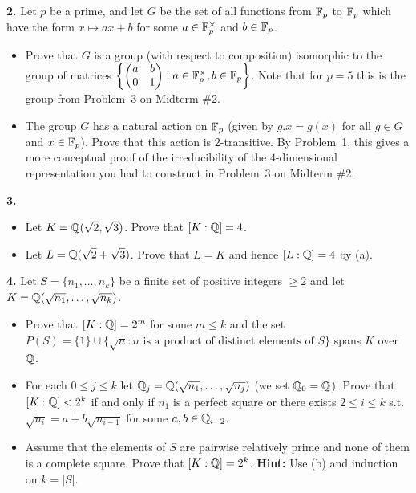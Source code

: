 \documentclass[11pt]{amsart}
\begin{document}
{\bf 2.} Let $p$ be a prime, and let 
$G$ be the set of all functions from ${\mathbb F}_p$ to ${\mathbb F}_p$ which have the form
$x\mapsto ax+b$ for some $a\in{\mathbb F}_p^{\times}$ and $b\in{\mathbb F}_p$.
\begin{itemize}
\item[(a)] Prove that $G$ is a group (with respect to composition) isomorphic to the group of matrices $\left\{\begin{pmatrix} a&b\\ 0&1\end{pmatrix}:
a\in{\mathbb F}_p^{\times}, b\in{\mathbb F}_p\right\}$. Note that for $p=5$ this is the group
from Problem~3 on Midterm \#2.
\item[(b)] The group $G$ has a natural action on ${\mathbb F}_p$ (given by
$g.x=g(x)$ for all $g\in G$ and $x\in{\mathbb F}_p$). Prove that this action is
$2$-transitive. By Problem~1, this gives a more conceptual proof of the irreducibility of the $4$-dimensional representation
you had to construct in Problem~3 on Midterm \#2. 
\end{itemize}
\skv
\skv
{\bf 3.} \rm 

\begin{itemize}

\item[(a)] Let $K={\mathbb Q}(\sqrt{2},\sqrt{3})$. Prove that $[K:{\mathbb Q}]=4$.

\item[(b)] Let $L={\mathbb Q}(\sqrt{2}+\sqrt{3})$. Prove that $L=K$ and hence $[L:{\mathbb Q}]=4$ by (a).
\end{itemize}

{\bf 4.} \rm Let $S=\{n_1,\ldots, n_k\}$ be a finite set of positive integers $\geq 2$
and let $K={\mathbb Q}(\sqrt{n_1},\ldots, \sqrt{n_k})$.
\begin{itemize}
\item[(a)] Prove that $[K:{\mathbb Q}]=2^m$ for some $m\leq k$ and the set $P(S)=\{1\}\cup \{\sqrt{n} : n \mbox{ is a product of distinct elements of }S\}$ spans $K$ over ${\mathbb Q}$.

\item[(b)] For each $0\leq j\leq k$ let ${\mathbb Q}_j={\mathbb Q}(\sqrt{n_1},\ldots, \sqrt{n_j})$ (we set ${\mathbb Q}_0={\mathbb Q}$).
Prove that $[K:{\mathbb Q}]<2^k$ if and only if $n_1$ is a perfect square or
there exists $2\leq i\leq k$ s.t. $\sqrt{n_i}=a+b\sqrt{n_{i-1}}$ for some $a,b\in{\mathbb Q}_{i-2}$.

\item[(c)] Assume that the elements of $S$ are pairwise relatively prime
and none of them is a complete square.
Prove that $[K:{\mathbb Q}]=2^k$. {\bf Hint:} Use (b) and induction on $k=|S|$.
\end{itemize}
\end{document}
